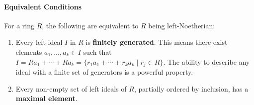 \documentclass[12pt]{article}
\theoremstyle{definition}
\numberwithin{equation}{subsection}
\begin{document}
\paragraph{Equivalent Conditions} 
For a ring $R$, the following are equivalent to $R$ being left-Noetherian:
\begin{enumerate}
\item Every left ideal $I$ in $R$ is \textbf{finitely generated}. This means there exist elements $a_1, \ldots, a_k \in I$ such that $I = Ra_1 + \cdots + Ra_k = \{r_1a_1 + \cdots + r_ka_k \mid r_j \in R\}$. The ability to describe any ideal with a finite set of generators is a powerful property.
\item Every non-empty set of left ideals of $R$, partially ordered by inclusion, has a \textbf{maximal element}.
\end{enumerate}
\end{document}
